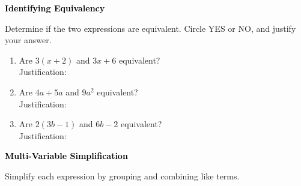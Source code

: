 \documentclass[12pt, letterpaper, fleqn]{article}
\newcommand{\blanklong}{\underline{\hspace{6.5cm}}}
\begin{document}
\newpage

\begin{tcolorbox}[colback=black!10]
\large\textcolor{black}{\textbf{Identifying Equivalency}}
\end{tcolorbox}

\noindent
Determine if the two expressions are equivalent. Circle YES or NO, and justify your answer.

\vspace{3mm}

\begin{enumerate}[itemsep=2.2cm, leftmargin=0.6cm]

\item Are $3(x + 2)$ \quad and \quad $3x + 6$ equivalent? \quad {} \quad {} \\
Justification: \blanklong

\vspace{2cm}

\item Are $4a + 5a$ \quad and \quad $9a^2$ equivalent? \quad {} \quad {} \\
Justification: \blanklong

\vspace{2cm}

\item Are $2(3b - 1)$ \quad and \quad $6b - 2$ equivalent? \quad {} \quad {} \\
Justification: \blanklong

\vspace{2cm}

\end{enumerate}

\newpage

\begin{tcolorbox}[colback=black!10]
\large\textcolor{black}{\textbf{Multi-Variable Simplification}}
\end{tcolorbox}

\noindent
Simplify each expression by grouping and combining like terms.

\vspace{3mm}
\end{document}
